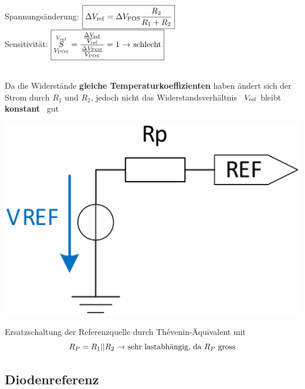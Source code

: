 \begin{minipage}[c]{0.78\columnwidth}

        Spannungsänderung:
        $\boxed{\Delta V_{\rm ref} = \Delta V_{\rm POS} \frac{R_2}{R_1 + R_2}} $ \\
        Sensitivität:       
        $\boxed{ \overunderset{V_{\rm ref}}{V_{\rm POS}}{S} = \frac{\frac{\Delta V_{\rm ref}}{V_{\rm ref}}}{\frac{\Delta V_{\rm POS}}{V_{\rm POS}}} = 1 \text{ \textrightarrow\ schlecht}}$

    \vspace{0.2cm}
     \\
    Da die Widerstände \textbf{gleiche Temperaturkoeffizienten} haben ändert sich der Strom durch $R_1$ und $R_2$, jedoch nicht das 
    Widerstandsverhältnis \textrightarrow\ $V_{\rm ref}$ bleibt \textbf{konstant} \textrightarrow\ gut

\end{minipage}


\begin{minipage}[c]{0.2\columnwidth}
    \includegraphics[width=\columnwidth]{images/thevenin.png}
\end{minipage}
\hfill
\begin{minipage}[c]{0.78\columnwidth}
    Ersatzschaltung der Referenzquelle durch Thévenin-Äquivalent mit
    $$ R_P = R_1 || R_2 \ \text{\textrightarrow\ sehr lastabhängig, da } R_P \text{ gross} $$
\end{minipage}


\subsection{Diodenreferenz}

